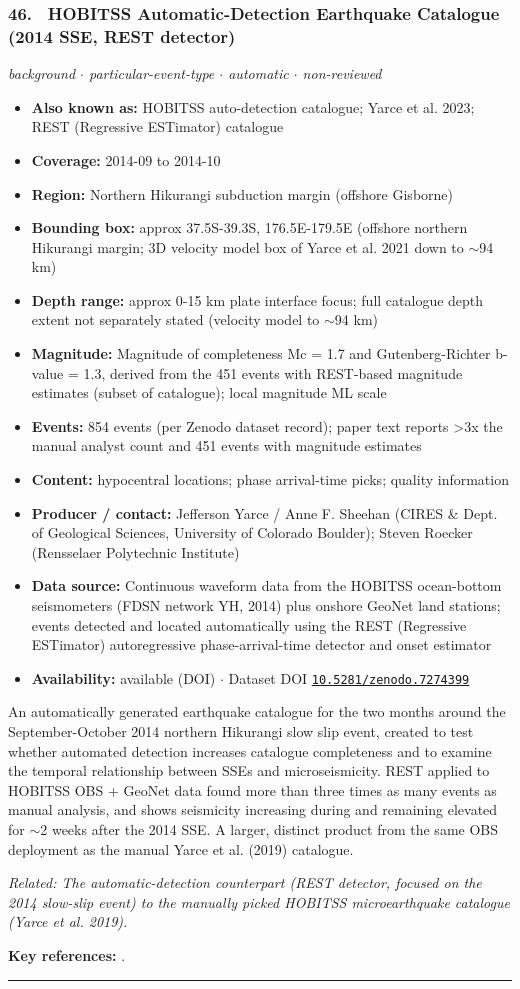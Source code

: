 \documentclass[10pt,a4paper]{article}
\newcommand{\catentryrule}{\par\vspace{3pt}\noindent\textcolor{rulegrey}{\rule{\linewidth}{0.3pt}}\par\vspace{5pt}}
\newcommand{\kv}[2]{\item \textbf{#1:} #2}
\begin{document}
\subsubsection*{\hypertarget{c:46}{46.}~ HOBITSS Automatic-Detection Earthquake Catalogue (2014 SSE, REST detector)}
{\small\itshape background $\cdot$ particular-event-type $\cdot$ automatic $\cdot$ non-reviewed}\par\vspace{2pt}
\begin{itemize}[leftmargin=1.3em,itemsep=0.6pt,topsep=1pt,parsep=0pt]
\kv{Also known as}{HOBITSS auto-detection catalogue; Yarce et al. 2023; REST (Regressive ESTimator) catalogue}
\kv{Coverage}{2014-09 to 2014-10}
\kv{Region}{Northern Hikurangi subduction margin (offshore Gisborne)}
\kv{Bounding box}{approx 37.5S-39.3S, 176.5E-179.5E (offshore northern Hikurangi margin; 3D velocity model box of Yarce et al. 2021 down to $\sim$94 km)}
\kv{Depth range}{approx 0-15 km plate interface focus; full catalogue depth extent not separately stated (velocity model to $\sim$94 km)}
\kv{Magnitude}{Magnitude of completeness Mc = 1.7 and Gutenberg-Richter b-value = 1.3, derived from the 451 events with REST-based magnitude estimates (subset of catalogue); local magnitude ML scale}
\kv{Events}{854 events (per Zenodo dataset record); paper text reports \textgreater{}3x the manual analyst count and 451 events with magnitude estimates}
\kv{Content}{hypocentral locations; phase arrival-time picks; quality information}
\kv{Producer / contact}{Jefferson Yarce / Anne F. Sheehan (CIRES \& Dept. of Geological Sciences, University of Colorado Boulder); Steven Roecker (Rensselaer Polytechnic Institute)}
\kv{Data source}{Continuous waveform data from the HOBITSS ocean-bottom seismometers (FDSN network YH, 2014) plus onshore GeoNet land stations; events detected and located automatically using the REST (Regressive ESTimator) autoregressive phase-arrival-time detector and onset estimator}
\kv{Availability}{available (DOI) $\cdot$ Dataset DOI \href{https://doi.org/10.5281/zenodo.7274399}{\nolinkurl{10.5281/zenodo.7274399}}}
\end{itemize}
\par\vspace{2pt}An automatically generated earthquake catalogue for the two months around the September-October 2014 northern Hikurangi slow slip event, created to test whether automated detection increases catalogue completeness and to examine the temporal relationship between SSEs and microseismicity. REST applied to HOBITSS OBS + GeoNet data found more than three times as many events as manual analysis, and shows seismicity increasing during and remaining elevated for $\sim$2 weeks after the 2014 SSE. A larger, distinct product from the same OBS deployment as the manual Yarce et al. (2019) catalogue.
\par{\small\itshape Related: The automatic-detection counterpart (REST detector, focused on the 2014 slow-slip event) to the manually picked HOBITSS microearthquake catalogue (Yarce et al. 2019).}
\par\vspace{2pt}\textbf{Key references:} \cite{Yarce2023,Yarce2022,UniversityofTexasatAustin2014}.
\catentryrule
\end{document}
